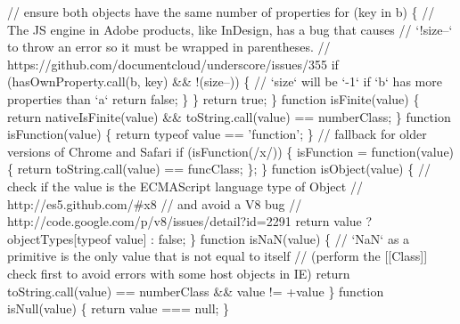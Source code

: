 \begin{DoxyCodeInclude}
{{\textcolor{stringliteral}{    // ensure both objects have the same number of properties}
\textcolor{stringliteral}{    for (key in b) \{}
\textcolor{stringliteral}{      // The JS engine in Adobe products, like InDesign, has a bug that causes}
\textcolor{stringliteral}{      // `!size--` to throw an error so it must be wrapped in parentheses.}
\textcolor{stringliteral}{      // https://github.com/documentcloud/underscore/issues/355}
\textcolor{stringliteral}{      if (hasOwnProperty.call(b, key) && !(size--)) \{}
\textcolor{stringliteral}{        // `size` will be `-1` if `b` has more properties than `a`}
\textcolor{stringliteral}{        return false;}
\textcolor{stringliteral}{      \}}
\textcolor{stringliteral}{    \}}
\textcolor{stringliteral}{    return true;}
\textcolor{stringliteral}{  \}}
\textcolor{stringliteral}{}
\textcolor{stringliteral}{  function isFinite(value) \{}
\textcolor{stringliteral}{    return nativeIsFinite(value) && toString.call(value) == numberClass;}
\textcolor{stringliteral}{  \}}
\textcolor{stringliteral}{}
\textcolor{stringliteral}{  function isFunction(value) \{}
\textcolor{stringliteral}{    return typeof value == 'function';}
\textcolor{stringliteral}{  \}}
\textcolor{stringliteral}{  // fallback for older versions of Chrome and Safari}
\textcolor{stringliteral}{  if (isFunction(/x/)) \{}
\textcolor{stringliteral}{    isFunction = function(value) \{}
\textcolor{stringliteral}{      return toString.call(value) == funcClass;}
\textcolor{stringliteral}{    \};}
\textcolor{stringliteral}{  \}}
\textcolor{stringliteral}{}
\textcolor{stringliteral}{  function isObject(value) \{}
\textcolor{stringliteral}{    // check if the value is the ECMAScript language type of Object}
\textcolor{stringliteral}{    // http://es5.github.com/#x8}
\textcolor{stringliteral}{    // and avoid a V8 bug}
\textcolor{stringliteral}{    // http://code.google.com/p/v8/issues/detail?id=2291}
\textcolor{stringliteral}{    return value ? objectTypes[typeof value] : false;}
\textcolor{stringliteral}{  \}}
\textcolor{stringliteral}{}
\textcolor{stringliteral}{  function isNaN(value) \{}
\textcolor{stringliteral}{    // `NaN` as a primitive is the only value that is not equal to itself}
\textcolor{stringliteral}{    // (perform the [[Class]] check first to avoid errors with some host objects in IE)}
\textcolor{stringliteral}{    return toString.call(value) == numberClass && value != +value}
\textcolor{stringliteral}{  \}}
\textcolor{stringliteral}{}
\textcolor{stringliteral}{  function isNull(value) \{}
\textcolor{stringliteral}{    return value === null;}
\textcolor{stringliteral}{  \}}
}}
\end{DoxyCodeInclude}
